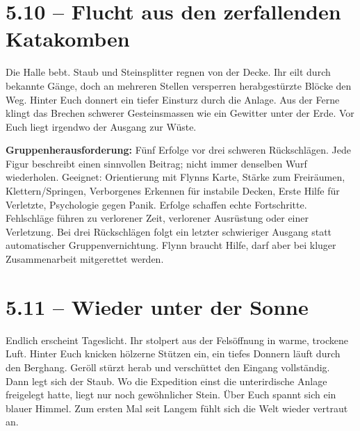 \section{5.10 -- Flucht aus den zerfallenden Katakomben}
\begin{vorlesetextalle}
Die Halle bebt. Staub und Steinsplitter regnen von der Decke. Ihr eilt durch bekannte Gänge, doch an mehreren Stellen versperren herabgestürzte Blöcke den Weg. Hinter Euch donnert ein tiefer Einsturz durch die Anlage. Aus der Ferne klingt das Brechen schwerer Gesteinsmassen wie ein Gewitter unter der Erde. Vor Euch liegt irgendwo der Ausgang zur Wüste.
\end{vorlesetextalle}
\begin{meisterinfo}
\textbf{Gruppenherausforderung:} Fünf Erfolge vor drei schweren Rückschlägen. Jede Figur beschreibt einen sinnvollen Beitrag; nicht immer denselben Wurf wiederholen. Geeignet: Orientierung mit Flynns Karte, Stärke zum Freiräumen, Klettern/Springen, Verborgenes Erkennen für instabile Decken, Erste Hilfe für Verletzte, Psychologie gegen Panik. Erfolge schaffen echte Fortschritte. Fehlschläge führen zu verlorener Zeit, verlorener Ausrüstung oder einer Verletzung. Bei drei Rückschlägen folgt ein letzter schwieriger Ausgang statt automatischer Gruppenvernichtung. Flynn braucht Hilfe, darf aber bei kluger Zusammenarbeit mitgerettet werden.
\end{meisterinfo}

\section{5.11 -- Wieder unter der Sonne}
\begin{vorlesetextalle}
Endlich erscheint Tageslicht. Ihr stolpert aus der Felsöffnung in warme, trockene Luft. Hinter Euch knicken hölzerne Stützen ein, ein tiefes Donnern läuft durch den Berghang. Geröll stürzt herab und verschüttet den Eingang vollständig. Dann legt sich der Staub. Wo die Expedition einst die unterirdische Anlage freigelegt hatte, liegt nur noch gewöhnlicher Stein. Über Euch spannt sich ein blauer Himmel. Zum ersten Mal seit Langem fühlt sich die Welt wieder vertraut an.
\end{vorlesetextalle}

